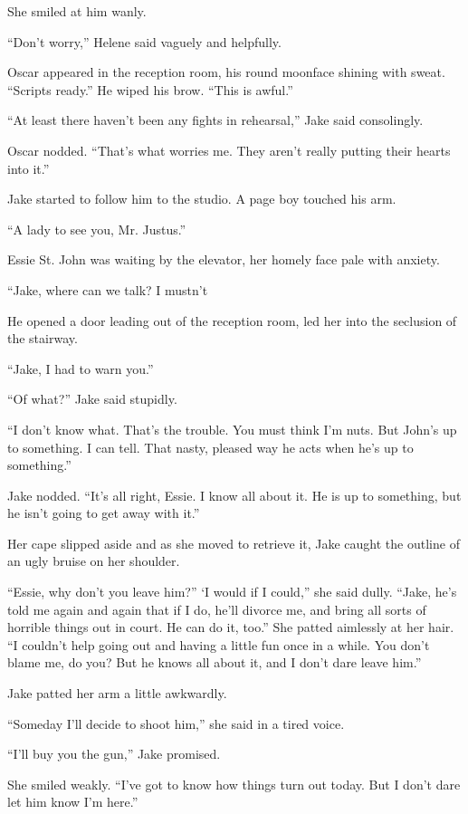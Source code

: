 \documentclass{novel}
\begin{document}
She smiled at him wanly.

“Don’t worry,” Helene said vaguely and helpfully.

Oscar appeared in the reception room, his round moonface shining with sweat. “Scripts ready.” He wiped his brow. “This is awful.”

“At least there haven’t been any fights in rehearsal,” Jake said consolingly.

Oscar nodded. “That’s what worries me. They aren’t really putting their hearts into it.”

Jake started to follow him to the studio. A page boy touched his arm.

“A lady to see you, Mr. Justus.”

Essie St. John was waiting by the elevator, her homely face pale with anxiety.

“Jake, where can we talk? I mustn’t

He opened a door leading out of the reception room, led her into the seclusion of the stairway.

“Jake, I had to warn you.”

“Of what?” Jake said stupidly.

“I don’t know what. That’s the trouble. You must think I’m nuts. But John’s up to something. I can tell. That nasty, pleased way he acts when he’s up to something.”

Jake nodded. “It’s all right, Essie. I know all about it. He is up to something, but he isn’t going to get away with it.”

Her cape slipped aside and as she moved to retrieve it, Jake caught the outline of an ugly bruise on her shoulder.

“Essie, why don’t you leave him?” ‘I would if I could,” she said dully. “Jake, he’s told me again and again that if I do, he’ll divorce me, and bring all sorts of horrible things out in court. He can do it, too.” She patted aimlessly at her hair. “I couldn’t help going out and having a little fun once in a while. You don’t blame me, do you? But he knows all about it, and I don’t dare leave him.”

Jake patted her arm a little awkwardly.

“Someday I'll decide to shoot him,” she said in a tired voice.

“I’ll buy you the gun,” Jake promised.

She smiled weakly. “I’ve got to know how things turn out today. But I don’t dare let him know I’m here.”
\end{document}
